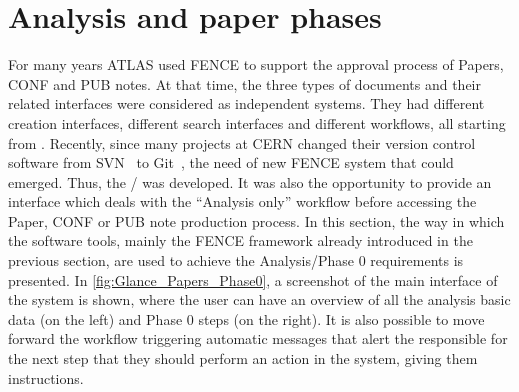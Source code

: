 
\section{Analysis and paper phases}%
\label{sec:Analysis_and_paper_phases}

For many years ATLAS used FENCE to support the approval process of Papers, CONF and PUB notes.
At that time, the three types of documents and their related interfaces were considered as independent systems.
They had different creation interfaces, different search interfaces and different workflows, all starting from .
Recently, since many projects at CERN changed their version control software from SVN~\cite{svn} to Git~\cite{gitlab}, the need of new FENCE system that could  emerged.
Thus, the / was developed. It was also the opportunity to provide an interface which deals with the \enquote{Analysis only} workflow before accessing the Paper, CONF or PUB note production process. 
In this section, the way in which the software tools, mainly the FENCE framework already introduced in the previous section, are used to achieve the Analysis/Phase 0 requirements is presented.
In \cref{fig:Glance_Papers_Phase0}, a screenshot of the main interface of the system is shown, where the user can have an overview of all the analysis basic data (on the left) and Phase 0 steps (on the right).
It is also possible to move forward the workflow triggering automatic messages that alert the responsible for the next step that they should perform an action in the system, giving them instructions.

